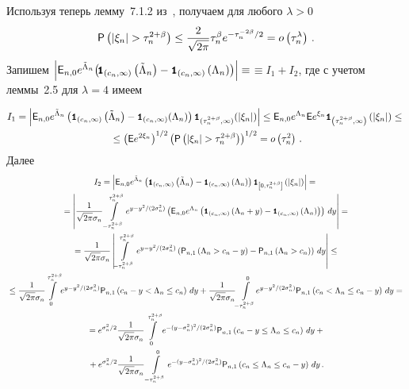 \begin{multicols}{2}
Используя теперь лемму~7.1.2 из~\cite{7ben}, получаем для любого $\lambda>0$
\begin{equation}
{\p}\left(\left|\xi_n\right|>\tau_n^{2+\beta}\right)\leq\fr{2}{\sqrt{2\pi}}
\tau_n^{\beta}e^{-\tau_n^{-2\beta}/2}= o\left(\tau_n^{\lambda}\right)\,.
\label{e2.21}
\end{equation}
Запишем
$\left|{{\sf E}}_{n,0}e^{\tilde\Lambda_n}\!\left(\!
{\mbox{{\small \tt {1}}\hspace{-1.5mm}{\tt 1}}}_{\left(c_n,\infty\right)}\left(\tilde\Lambda_n\right)-
{\mbox{{\small \tt {1}}\hspace{-1.5mm}{\tt 1}}}_{\left(c_n,\infty\right)}\left(\Lambda_n\right)\right)\right|
\equiv$\linebreak $\equiv I_1+I_2$,
где с учетом леммы~2.5 для $\lambda=4$ имеем
\pagebreak

\end{multicols}

\noindent
\begin{multline*}
I_1=
\left|{\e}_{n,0}e^{\tilde\Lambda_n}\left({\Ik}_{\left(c_n,\infty\right)}
\left(\tilde\Lambda_n\right)-{\Ik}_{\left(c_n,\infty\right)}(\Lambda_n)\right)
{\Ik}_{(\tau_n^{2+\beta},\infty)}(|\xi_n|)\right|\leq
 {\e}_{n,0}e^{\Lambda_n} {\e}e^{\xi_n}{\Ik}_{\left(\tau_n^{2+\beta},\infty\right)}\left(\left|\xi_n\right|\right)\leq{}\\
{}\leq
\left({\e}e^{2\xi_n}\right)^{1/2}\left({\p}\left(\left|\xi_n\right|>\tau_n^{2+\beta}\right) \right)^{1/2}= 
o\left(\tau_n^2\right)\,.
\end{multline*}
Далее
\begin{multline*}
I_2=
\left| {\e}_{n,0}e^{\tilde\Lambda_n}\left({\Ik}_{\left(c_n,\infty\right)}\left(\tilde\Lambda_n\right)-
{\Ik}_{\left(c_n,\infty\right)}\left(\Lambda_n\right)\right)
{\Ik}_{\left[0,\tau_n^{2+\beta}\right]}\left(\left|\xi_n\right|\right) \right|={}\\
{}
=\left| \fr{1}{\sqrt{2\pi}\sigma_n}\int\limits_{-\tau_n^{2+\beta}}^{\tau_n^{2+\beta}}
e^{y-{y^2}/(2\sigma_n^2)}
\left( {\e}_{n,0}e^{\Lambda_n}\left({\Ik}_{\left(c_n,\infty\right)}\left(\Lambda_n+y\right) - {\Ik}_{\left(c_n,\infty\right)}\left(\Lambda_n\right)\right) \right)\,dy \right|={}\\
{}
=\fr{1}{\sqrt{2\pi}\sigma_n}\left| \int\limits_{-\tau_n^{2+\beta}}^{\tau_n^{2+\beta}}
e^{y-{y^2}/(2\sigma_n^2)}
\left( {\p}_{n,1}\left(\Lambda_n>c_n-y\right) - {\p}_{n,1}\left(\Lambda_n>c_n\right) \right)\,dy \right|\leq{}\\
{}
\leq\fr{1}{\sqrt{2\pi}\sigma_n}\!\int\limits_{0}^{\tau_n^{2+\beta}}\!
e^{y-{y^2}/(2\sigma_n^2)}{\p}_{n,1}\left(c_n-y<\Lambda_n\leq c_n\right)\,dy
+\fr{1}{\sqrt{2\pi}\sigma_n}\!\int\limits_{-\tau_n^{2+\beta}}^{0}\!
e^{y-{y^2}/(2\sigma_n^2)}{\p}_{n,1}\left(c_n<\Lambda_n\leq c_n-y\right)\,dy={}
\\
{}=e^{{\sigma_n^2}/2}\fr{1}{\sqrt{2\pi}\sigma_n}\int\limits_{0}^{\tau_n^{2+\beta}}
e^{-{(y-\sigma_n^2)^2}/(2\sigma_n^2)}{\p}_{n,1}\left(c_n-y\leq\Lambda_n\leq c_n\right)\,dy+{}\\
{}
+e^{\sigma_n^2/2}\fr{1}{\sqrt{2\pi}\sigma_n}\int\limits_{-\tau_n^{2+\beta}}^{0}
e^{-{(y-\sigma_n^2)^2}/(2\sigma_n^2)}{\p}_{n,1}\left(c_n\leq\Lambda_n\leq c_n-y\right)\,dy\,.
\end{multline*}
